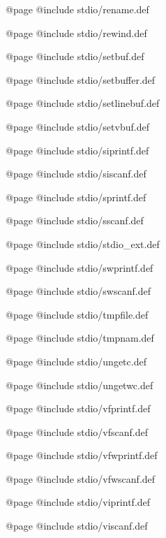 @page
@include stdio/rename.def

@page
@include stdio/rewind.def

@page
@include stdio/setbuf.def

@page
@include stdio/setbuffer.def

@page
@include stdio/setlinebuf.def

@page
@include stdio/setvbuf.def

@page
@include stdio/siprintf.def

@page
@include stdio/siscanf.def

@page
@include stdio/sprintf.def

@page
@include stdio/sscanf.def

@page
@include stdio/stdio_ext.def

@page
@include stdio/swprintf.def

@page
@include stdio/swscanf.def

@page
@include stdio/tmpfile.def

@page
@include stdio/tmpnam.def

@page
@include stdio/ungetc.def

@page
@include stdio/ungetwc.def

@page
@include stdio/vfprintf.def

@page
@include stdio/vfscanf.def

@page
@include stdio/vfwprintf.def

@page
@include stdio/vfwscanf.def

@page
@include stdio/viprintf.def

@page
@include stdio/viscanf.def
